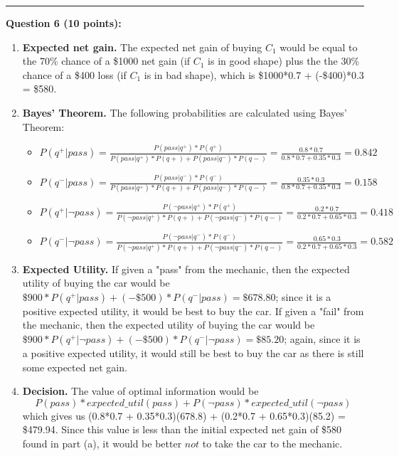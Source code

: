 \documentclass[12pt]{article}
\begin{document}
\rule{\linewidth}{0.4pt}
\vspace{.2cm}

\textbf{Question 6 (10 points):}

\begin{enumerate}[label=(\alph*)]
    \item \textbf{Expected net gain.} The expected net gain of buying $C_1$ would be equal to the 70\% chance of a \$1000 net gain (if $C_1$ is in good shape) plus the the 30\% chance of a \$400 loss (if $C_1$ is in bad shape), which is \$1000*0.7 + (-\$400)*0.3 = \$580.

    \item \textbf{Bayes' Theorem.} The following probabilities are calculated using Bayes' Theorem:
        \begin{itemize}
            \item $P(q^+ | pass) = \frac{P(pass | q^+) * P(q^+)}{P(pass | q^+)*P(q+) + P(pass | q^-)*P(q-)} = \frac{0.8*0.7}{0.8*0.7 + 0.35*0.3} = 0.842$
            \item $P(q^- | pass) = \frac{P(pass | q^-) * P(q^-)}{P(pass | q^+)*P(q+) + P(pass | q^-)*P(q-)} = \frac{0.35*0.3}{0.8*0.7 + 0.35*0.3} = 0.158$
            \item $P(q^+ | \neg pass) = \frac{P(\neg pass | q^+) * P(q^+)}{P(\neg pass | q^+)*P(q+) + P(\neg pass | q^-)*P(q-)} = \frac{0.2*0.7}{0.2*0.7 + 0.65*0.3} = 0.418$
            \item $P(q^- | \neg pass) = \frac{P(\neg pass | q^-) * P(q^-)}{P(\neg pass | q^+)*P(q+) + P(\neg pass | q^-)*P(q-)} = \frac{0.65*0.3}{0.2*0.7 + 0.65*0.3} = 0.582$
        \end{itemize}

    \item \textbf{Expected Utility.} If given a "pass" from the mechanic, then the expected utility of buying the car would be $\$900*P(q^+ | pass) + (-\$500)*P(q^- | pass) = \$678.80$; since it is a positive expected utility, it would be best to buy the car. If given a "fail" from the mechanic, then the expected utility of buying the car would be $\$900*P(q^+ | \neg pass) + (-\$500)*P(q^- | \neg pass) = \$85.20$; again, since it is a positive expected utility, it would still be best to buy the car as there is still some expected net gain. 

    \item \textbf{Decision.} The value of optimal information would be 
    \begin{equation}
        P(pass)*expected\_util(pass) + P(\neg pass)*expected\_util(\neg pass) 
    \end{equation}
    which gives us (0.8*0.7 + 0.35*0.3)(678.8) + (0.2*0.7 + 0.65*0.3)(85.2) = \$479.94. Since this value is less than the initial expected net gain of \$580 found in part (a), it would be better $not$ to take the car to the mechanic.
    
\end{enumerate}
\end{document}
